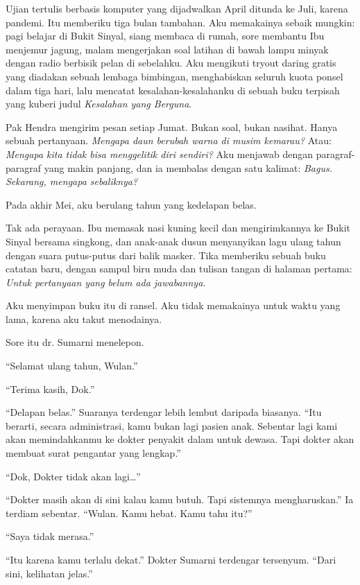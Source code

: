 \documentclass[11pt,twoside,openany]{book}
\makeatletter
\newcommand{\scenebreak}{\par\vspace{0.9em}{\centering\textsc{*\hspace{0.7em}*\hspace{0.7em}*}\par}\vspace{0.9em}\@afterindentfalse\@afterheading}
\makeatother
\begin{document}
Ujian tertulis berbasis komputer yang dijadwalkan April ditunda ke Juli, karena pandemi. Itu memberiku tiga bulan tambahan. Aku memakainya sebaik mungkin: pagi belajar di Bukit Sinyal, siang membaca di rumah, sore membantu Ibu menjemur jagung, malam mengerjakan soal latihan di bawah lampu minyak dengan radio berbisik pelan di sebelahku. Aku mengikuti tryout daring gratis yang diadakan sebuah lembaga bimbingan, menghabiskan seluruh kuota ponsel dalam tiga hari, lalu mencatat kesalahan-kesalahanku di sebuah buku terpisah yang kuberi judul \emph{Kesalahan yang Berguna}.

Pak Hendra mengirim pesan setiap Jumat. Bukan soal, bukan nasihat. Hanya sebuah pertanyaan. \emph{Mengapa daun berubah warna di musim kemarau?} Atau: \emph{Mengapa kita tidak bisa menggelitik diri sendiri?} Aku menjawab dengan paragraf-paragraf yang makin panjang, dan ia membalas dengan satu kalimat: \emph{Bagus. Sekarang, mengapa sebaliknya?}

\scenebreak
Pada akhir Mei, aku berulang tahun yang kedelapan belas.

Tak ada perayaan. Ibu memasak nasi kuning kecil dan mengirimkannya ke Bukit Sinyal bersama singkong, dan anak-anak dusun menyanyikan lagu ulang tahun dengan suara putus-putus dari balik masker. Tika memberiku sebuah buku catatan baru, dengan sampul biru muda dan tulisan tangan di halaman pertama: \emph{Untuk pertanyaan yang belum ada jawabannya.}

Aku menyimpan buku itu di ransel. Aku tidak memakainya untuk waktu yang lama, karena aku takut menodainya.

Sore itu dr. Sumarni menelepon.

``Selamat ulang tahun, Wulan.''

``Terima kasih, Dok.''

``Delapan belas.'' Suaranya terdengar lebih lembut daripada biasanya. ``Itu berarti, secara administrasi, kamu bukan lagi pasien anak. Sebentar lagi kami akan memindahkanmu ke dokter penyakit dalam untuk dewasa. Tapi dokter akan membuat surat pengantar yang lengkap.''

``Dok, Dokter tidak akan lagi\ldots{}''

``Dokter masih akan di sini kalau kamu butuh. Tapi sistemnya mengharuskan.'' Ia terdiam sebentar. ``Wulan. Kamu hebat. Kamu tahu itu?''

``Saya tidak merasa.''

``Itu karena kamu terlalu dekat.'' Dokter Sumarni terdengar tersenyum. ``Dari sini, kelihatan jelas.''
\end{document}
